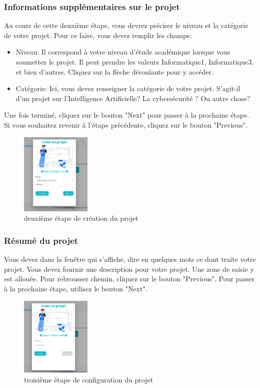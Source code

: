 \documentclass[12pt]{article}
\begin{document}
\smallskip
\subsubsection{Informations supplémentaires sur le projet}
Au cours de cette deuxième étape, vous devrez préciser le niveau et la catégorie de votre projet. Pour ce faire, vous devez remplir les champs:
\begin{itemize}
    \item Niveau: Il correspond à votre niveau d'étude académique lorsque vous soumettez le projet. Il peut prendre les valeurs Informatique1, Informatique3, et bien d'autres. Cliquez sur la flèche déroulante pour y accéder.
    \item Catégorie: Ici, vous devez renseigner la catégorie de votre projet. S'agit-il d'un projet sur l'Intelligence Artificielle? La cybersécurité ? Ou autre chose?
\end{itemize} 
Une fois terminé, cliquez sur le bouton "Next" pour passer à la prochaine étape.
Si vous souhaitez revenir à l'étape précédente, cliquez sur le bouton "Previous".

\begin{figure}[h!]
    \centering
    \includegraphics[width=0.3\textwidth]{./images/step2-create-project.png}
    \caption{deuxième étape de création du projet}
    \label{fig:deuxième étape de création du projet}
\end{figure}

\medskip
\subsubsection{Résumé du projet}
Vous devez dans la fenêtre qui s'affiche, dire en quelques mots ce dont traite votre projet. Vous devez fournir une description
pour votre projet. Une zone de saisie y est allouée. Pour rebrousser chemin, cliquez sur le bouton "Previous". Pour passer à la prochaine étape, utilisez le bouton "Next".

\begin{figure}[h!]
    \centering
    \includegraphics[width=0.3\textwidth]{./images/step3-create-project.png}
    \caption{troisième étape de configuration du projet}
    \label{fig:troisième étape de création du projet}
\end{figure}
\end{document}
